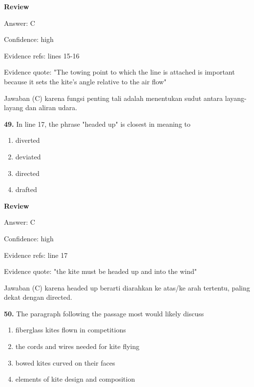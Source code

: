 \documentclass[12pt]{article}
\begin{document}
\par
\begingroup
\setlength{\parskip}{0pt}
\setlength{\parindent}{0pt}
\textbf{Review}\par
Answer: C\par
Confidence: high\par
Evidence refs: lines 15-16\par
Evidence quote: "The towing point to which the line is attached is important because it sets the kite's angle relative to the air flow"\par
Jawaban (C) karena fungsi penting tali adalah menentukan sudut antara layang-layang dan aliran udara.\par
\endgroup
\par
\vspace{0.25\baselineskip}
\noindent\textbf{49.} In line 17, the phrase "headed up" is closest in meaning to
\begin{enumerate}[label=(\Alph*),leftmargin=*,itemsep=0.2em]
\item diverted
\item deviated
\item directed
\item drafted
\end{enumerate}
\par
\begingroup
\setlength{\parskip}{0pt}
\setlength{\parindent}{0pt}
\textbf{Review}\par
Answer: C\par
Confidence: high\par
Evidence refs: line 17\par
Evidence quote: "the kite must be headed up and into the wind"\par
Jawaban (C) karena headed up berarti diarahkan ke atas/ke arah tertentu, paling dekat dengan directed.\par
\endgroup
\par
\vspace{0.25\baselineskip}
\noindent\textbf{50.} The paragraph following the passage most would likely discuss
\begin{enumerate}[label=(\Alph*),leftmargin=*,itemsep=0.2em]
\item fiberglass kites flown in competitions
\item the cords and wires needed for kite flying
\item bowed kites curved on their faces
\item elements of kite design and composition
\end{enumerate}
\par
\end{document}
